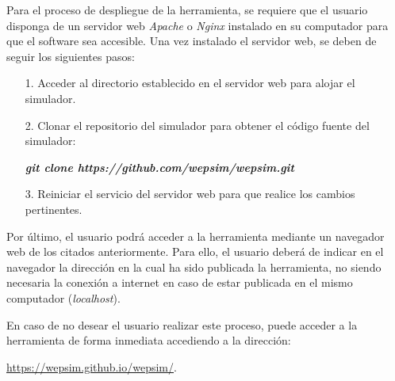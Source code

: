 Para el proceso de despliegue de la herramienta, se requiere que el usuario disponga de un servidor web \textit{Apache}  o \textit{Nginx} instalado en su computador para que el software sea accesible. Una vez instalado el servidor web, se deben de seguir los siguientes pasos:

\begin{itemize}

	\item[1.] Acceder al directorio establecido en el servidor web para alojar el simulador.

	\item[2.] Clonar el repositorio del simulador para obtener el código fuente del simulador:
	
	 \textbf{\textit{git clone https://github.com/wepsim/wepsim.git}}
	
	\item[3.] Reiniciar el servicio del servidor web para que realice los cambios pertinentes.

\end{itemize}

Por último, el usuario podrá acceder a la herramienta mediante un navegador web de los citados anteriormente. Para ello, el usuario deberá de indicar en el navegador la dirección en la cual ha sido publicada la herramienta, no siendo necesaria la conexión a internet en caso de estar publicada en el mismo computador (\textit{localhost}).

En caso de no desear el usuario realizar este proceso, puede acceder a la herramienta de forma inmediata accediendo a la dirección: 

\url{https://wepsim.github.io/wepsim/}.